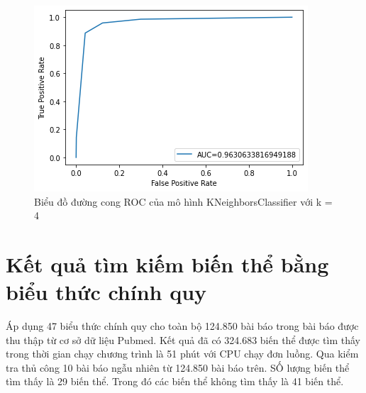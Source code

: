\documentclass[../DoAn.tex]{subfiles}
\begin{document}
\begin{figure}
\centering
\includegraphics[width=1\linewidth]{Hinh_ve/KNeighborsClassifiepk4.png}
\caption{Biểu đồ đường cong ROC của mô hình KNeighborsClassifier với k = 4}
\label{fig:knnk4}
\end{figure}

\section{Kết quả tìm kiếm biến thể bằng biểu thức chính quy}
Áp dụng 47 biểu thức chính quy cho toàn bộ 124.850 bài báo trong bài báo được thu thập từ cơ sở dữ liệu Pubmed. Kết quả đã có 324.683 biến thể được tìm thấy trong thời gian chạy chương trình là 51 phút với CPU chạy đơn luồng.
Qua kiểm tra thủ công 10 bài báo ngẫu nhiên từ 124.850 bài báo trên. SỐ lượng biến thể tìm thấy là 29 biến thể. Trong đó các biến thể không tìm thấy là 41 biến thể. 
\end{document}
